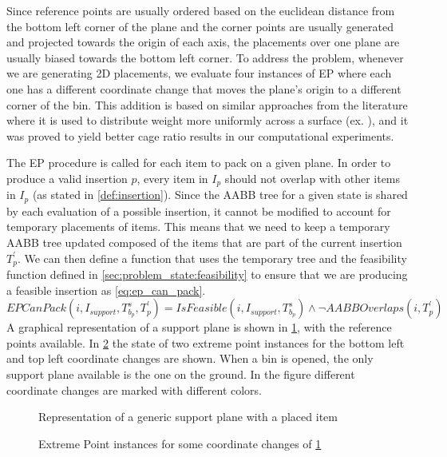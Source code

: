 Since reference points are usually ordered based on the euclidean distance from the bottom left corner of the plane and the corner points are usually generated and projected towards the origin of each axis, the placements over one plane are usually biased towards the bottom left corner.
To address the problem, whenever we are generating 2D placements, we evaluate four instances of EP where each one has a different coordinate change that moves the plane's origin to a different corner of the bin.
This addition is based on similar approaches from the literature where it is used to distribute weight more uniformly across a surface (ex. \cite{GAJDA2022102559}), and it was proved to yield better cage ratio results in our computational experiments.

The EP procedure is called for each item to pack on a given plane.
In order to produce a valid insertion $p$, every item in $I_p$ should not overlap with other items in $I_p$ (as stated in \cref{def:insertion}).
Since the AABB tree for a given state is shared by each evaluation of a possible insertion, it cannot be modified to account for temporary placements of items.
This means that we need to keep a temporary AABB tree updated composed of the items that are part of the current insertion $T^\prime_p$.
We can then define a function that uses the temporary tree and the feasibility function defined in \cref{sec:problem_state:feasibility} to ensure that we are producing a feasible insertion as \cref{eq:ep_can_pack}.
\begin{equation}
    \label{eq:ep_can_pack}
    EPCanPack(i, I_{support}, T^s_{b_p}, T^\prime_p) = IsFeasible(i, I_{support}, T^s_{b_p}) \land \lnot AABBOverlaps(i, T^\prime_p)
\end{equation}
A graphical representation of a support plane is shown in \cref{fig:support_planes}, with the reference points available. In \cref{fig:ep_coordinate_changes} the state of two extreme point instances for the bottom left and top left coordinate changes are shown.
When a bin is opened, the only support plane available is the one on the ground.
In the figure different coordinate changes are marked with different colors.

\begin{figure}[hp]
    \centering
    \scalebox{0.9}{%
    
    }
    \caption{Representation of a generic support plane with a placed item}
    \label{fig:support_planes}
\end{figure}

\begin{figure}[hp]
    \centering
    
    \caption{Extreme Point instances for some coordinate changes of \cref{fig:support_planes}}
    \label{fig:ep_coordinate_changes}
\end{figure}


